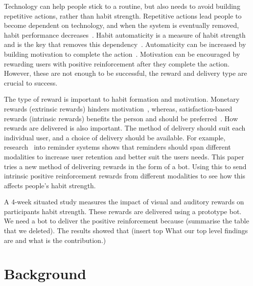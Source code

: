 \documentclass{scaffold/sigchi}
\begin{document}
Technology can help people stick to a routine, but also needs to avoid building repetitive actions, rather than habit strength. Repetitive actions lead people to become dependent on technology, and when the system is eventually removed, habit performance decreases~\cite{}. Habit automaticity is a measure of habit strength and is the key that removes this dependency~\cite{article_beyond_self_tracking_designing_apps}. Automaticity can be increased by building motivation to complete the action~\cite{article_a_self_efficacy, article_meta_analytic_review_intrinsic_motivation}.
Motivation can be encouraged by rewarding users with positive reinforcement after they complete the action.
However, these are not enough to be successful, the reward and delivery type are crucial to success.

The type of reward is important to habit formation and motivation. Monetary rewards (extrinsic rewards) hinders motivation~\cite{article_meta_analytic_review_intrinsic_motivation}, whereas, satisfaction-based rewards (intrinsic rewards) benefits the person and should be preferred~\cite{article_meta_analytic_review_intrinsic_motivation}.
How rewards are delivered is also important. The method of delivery should suit each individual user, and a choice of delivery should be available. For example, research~\cite{article_user_centred_multimodal_reminders} into reminder systems shows that reminders should span different modalities to increase user retention and better suit the users needs.
This paper tries a new method of delivering rewards in the form of a bot. Using this to send intrinsic positive reinforcement rewards from different modalities to see how this affects people's habit strength.

A 4-week situated study measures the impact of visual and auditory rewards on participants habit strength. These rewards are delivered using a prototype bot. We need a bot to deliver the positive reinforcement because (summarise the table that we deleted). The results showed that (insert top What our top level findings are and what is the contribution.)


\section{Background}
\end{document}

